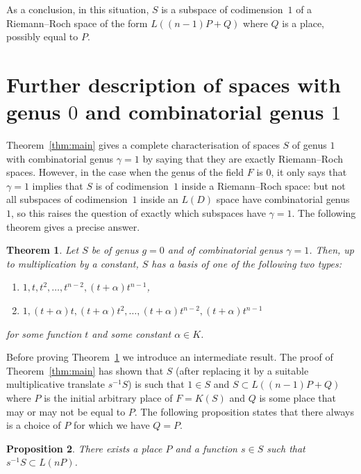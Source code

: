 \documentclass[10pt]{amsart}
\newtheorem{theo}{Theorem}[section]
\newtheorem{prop}[theo]{Proposition}
\theoremstyle{definition}
\theoremstyle{remark}
\begin{document}
As a conclusion, in this situation, $S$ is a subspace of codimension~$1$ of a Riemann--Roch space of the form $L((n-1)P+Q)$ where $Q$ is a place, possibly equal to $P$.


\section{Further description of spaces with genus \texorpdfstring{$0$}{0} and combinatorial genus \texorpdfstring{$1$}{1}}\label{sec:genus0}

Theorem~\ref{thm:main} gives a complete characterisation of spaces $S$ of genus $1$ with combinatorial genus $\gamma=1$ by saying that they are exactly Riemann--Roch spaces. However, in the case when the genus of the field $F$ is $0$, it only says that $\gamma=1$ implies that $S$ is of codimension~$1$ inside a Riemann--Roch space: but not all subspaces of codimension~$1$ inside an $L(D)$ space have combinatorial genus $1$, so this raises the question of exactly which subspaces have $\gamma=1$. The following theorem gives a precise answer.

\begin{theo}\label{thm:g=0}
Let $S$ be of genus $g=0$ and of combinatorial genus $\gamma=1$. Then, up to multiplication by a constant, $S$ has a basis of one of the following two types:
\begin{enumerate}
\item $1,t,t^2,\ldots,t^{n-2},(t+\alpha)t^{n-1}$,
\item $1,(t+\alpha)t,(t+\alpha)t^2,\ldots, (t+\alpha)t^{n-2}, (t+\alpha)t^{n-1}$
\end{enumerate}
for some function $t$ and some constant $\alpha\in K$.
\end{theo}

Before proving Theorem~\ref{thm:g=0} we introduce an intermediate result. The proof of Theorem~\ref{thm:main} has shown that $S$ (after replacing it by a suitable multiplicative translate $s^{-1}S$) is such that $1\in S$ and $S\subset L((n-1)P+Q)$ where $P$ is the initial arbitrary place of $F=K(S)$ and $Q$ is some place that may or may not be equal to $P$. The following proposition states that there always is a choice of $P$ for which we have $Q=P$.

\begin{prop}\label{prop:goodP}
There exists a place $P$ and a function $s\in S$ such that $s^{-1}S\subset L(nP)$.
\end{prop}
\end{document}
